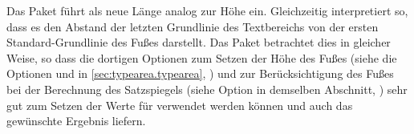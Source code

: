 \begin{Declaration}
\end{Declaration}
Das Paket  führt als neue Länge  analog
zur Höhe  ein. Gleichzeitig interpretiert
 so, dass es den Abstand der letzten Grundlinie des
Textbereichs von der ersten Standard-Grundlinie des Fußes darstellt. Das Paket
\hyperref[cha:typearea]{}%
 betrachtet dies in
gleicher Weise, so dass die dortigen Optionen zum Setzen der Höhe des Fußes
(siehe die Optionen  und
 in \autoref{sec:typearea.typearea},
) und zur Berücksichtigung des Fußes
bei der Berechnung des Satzspiegels (siehe Option
 in demselben Abschnitt,
) sehr gut zum Setzen der Werte für
 verwendet werden können und auch das gewünschte Ergebnis
liefern.

